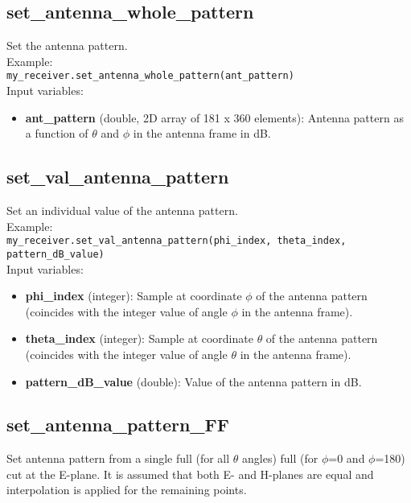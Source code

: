 \subsection{set\_antenna\_whole\_pattern}

Set the antenna pattern.\\

Example:\\

\texttt{my\_receiver.set\_antenna\_whole\_pattern(ant\_pattern)}\\

Input variables:
\begin{itemize}
\item {\bf ant\_pattern} (double, 2D array of 181 x 360 elements): Antenna pattern as a function of $\theta$ and $\phi$ in the antenna frame in dB.
\end{itemize}


\subsection{set\_val\_antenna\_pattern}

Set an individual value of the antenna pattern.\\

Example:\\

\texttt{my\_receiver.set\_val\_antenna\_pattern(phi\_index, theta\_index, pattern\_dB\_value)}\\

Input variables:
\begin{itemize}
\item {\bf phi\_index} (integer): Sample at coordinate $\phi$ of the antenna pattern (coincides with the integer value of angle $\phi$ in the antenna frame).
\item {\bf theta\_index} (integer): Sample at coordinate $\theta$ of the antenna pattern (coincides with the integer value of angle $\theta$ in the antenna frame).
\item {\bf pattern\_dB\_value} (double): Value of the antenna pattern in dB.
\end{itemize}


\subsection{set\_antenna\_pattern\_FF}

Set antenna pattern from a single full (for all $\theta$ angles) full (for $\phi$=0 and $\phi$=180) cut at the E-plane. It is assumed that both E- and H-planes are equal and interpolation is applied for the remaining points.\\

